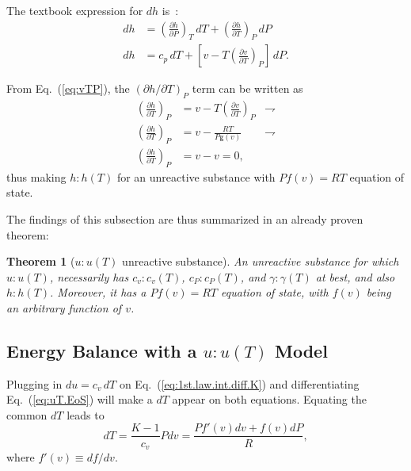 \documentclass[fleqn,11pt]{SelfArx}
\newcommand{\parxyz}[3]{\left(\frac{\partial {{#1}}}{\partial {{#2}}}\right)_{\!\!\!{#3}}}
\newcommand{\inlxyz}[3]{({\partial {{#1}}}/{\partial {{#2}}})_{{#3}}}
\newtheorem{theorem}{Theorem}
\begin{document}
    The textbook expression for $dh$ is~\cite{2013-CengelYA+BolesMA-AMGH}:
    \begin{align}
        dh & = \parxyz hPT \,dT + \parxyz hTP \,dP \\
        dh & = c_p\,dT + \left[v - T\parxyz vTP \right]\,dP.
        \label{eq:dh}
    \end{align}

    From Eq.~(\ref{eq:vTP}), the $\inlxyz hTP$ term can be written as
    \begin{align}
        \parxyz hTP & = v - T\parxyz vTP & \rightharpoondown \\
        \parxyz hTP & = v - \frac{RT}{P\mathsf{g}(v)} & \rightharpoondown \\
        \parxyz hTP & = v - v = 0,
        \label{eq:hTP}
    \end{align}
    \noindent thus making $h\!:\!h(T)$ for an unreactive substance with $Pf(v) = RT$ equation of
    state.

    The findings of this subsection are thus summarized in an already proven theorem:

    \begin{theorem}[$u\!:\!u(T)$ unreactive substance]\label{theo:uT.subst}
        An unreactive  substance  for  which  $u\!:\!u(T)$,  necessarily  has  $c_v\!:\!c_v(T)$,
        $c_P\!:\!c_P(T)$, and $\gamma\!:\!\gamma(T)$ at best, and also  $h\!:\!h(T)$.  Moreover,
        it has a $Pf(v) = RT$ equation of state, with $f(v)$ being an arbitrary function of $v$.
    \end{theorem}

    \subsection{Energy Balance with a $u\!:\!u(T)$ Model}\label{sec:energy.balance}

    Plugging  in  $du  =  c_v\,dT$  on  Eq.~(\ref{eq:1st.law.int.diff.K})  and   differentiating
    Eq.~(\ref{eq:uT.EoS}) will make a $dT$ appear on both equations. Equating  the  common  $dT$
    leads to
    \begin{equation}
        dT = \frac{K-1}{c_v}Pdv = \frac{Pf'(v)dv + f(v)dP}{R},
        \label{eq:dT.1st.law.EoS}
    \end{equation}
    \noindent where $f'(v) \equiv df/dv$.
\end{document}
